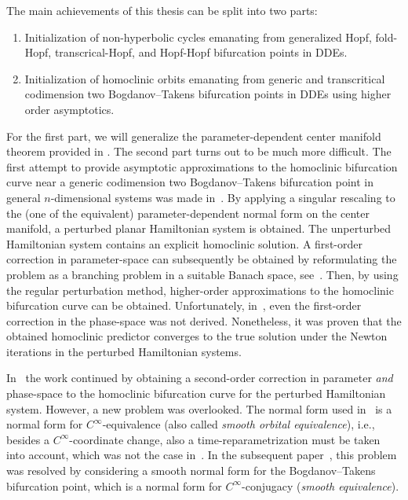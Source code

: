 The main achievements of this thesis can be split into two parts:
\begin{enumerate}[label=\Roman*.]
    \item Initialization of non-hyperbolic cycles emanating from generalized
        Hopf, fold-Hopf, transcrical-Hopf, and Hopf-Hopf bifurcation points in DDEs.
    \item Initialization of homoclinic orbits emanating from generic and transcritical
        codimension two Bogdanov--Takens bifurcation points in DDEs using higher order
        asymptotics.
\end{enumerate}

For the first part, we will generalize the parameter-dependent center manifold
theorem provided in \cite{diekmann1995delay}. The second part turns out to be
much more difficult. The first attempt to provide asymptotic approximations to the
homoclinic bifurcation curve near a generic codimension two Bogdanov--Takens
bifurcation point in general $n$-dimensional systems was made
in~\cite{Beyn_1994}. By applying a singular rescaling to the (one of the
equivalent) parameter-dependent normal form on the center manifold, a perturbed
planar Hamiltonian system is obtained. The unperturbed Hamiltonian system
contains an explicit homoclinic solution. A first-order correction in
parameter-space can subsequently be obtained by reformulating the problem as a
branching problem in a suitable Banach space, see~\cite{Beyn_1994}.  Then, by
using the regular perturbation method, higher-order approximations to the
homoclinic bifurcation curve can be obtained. Unfortunately, in~\cite{Beyn_1994},
even the first-order correction in the phase-space was not derived.  Nonetheless,
it was proven that the obtained homoclinic predictor converges to the true
solution under the Newton iterations in the perturbed Hamiltonian systems.

In~\cite{Kuznetsov2014improved} the work continued by obtaining a second-order
correction in parameter \emph{and} phase-space to the homoclinic bifurcation
curve for the perturbed Hamiltonian system. However, a new problem was
overlooked.  The normal form used in~\cite{Kuznetsov2014improved} is a normal
form for $C^\infty$-equivalence (also called \emph{smooth orbital equivalence}),
i.e., besides a $C^\infty$-coordinate change, also a time-reparametrization must
be taken into account, which was not the case in~\cite{Kuznetsov2014improved}. In
the subsequent paper~\cite{Gray-Scott2015}, this problem was resolved by
considering a smooth normal form for the Bogdanov--Takens bifurcation point,
which is a normal form for $C^\infty$-conjugacy (\emph{smooth equivalence}). 

